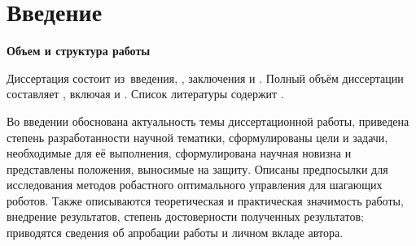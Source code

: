 \chapter*{Введение}                         %

\newcommand{\actuality}{\textbf{\actualityTXT}}
\newcommand{\progress}{\textbf{\progressTXT}}
\newcommand{\objectsubject}{\textbf{\objectsubjectTXT}}
\newcommand{\aimtasks}{\textbf{\aimtasksTXT}}
\newcommand{\methods}{\textbf{\methodsTXT}}
\newcommand{\defpositions}{\textbf{\defpositionsTXT}}
\newcommand{\compliances}{\textbf{\complianceTXT}}
\newcommand{\novelty}{\textbf{\noveltyTXT}}
\newcommand{\probation}{\textbf{\probationTXT}}
\newcommand{\influence}{\textbf{\influenceTXT}}
\newcommand{\reliability}{\textbf{\reliabilityTXT}}
\newcommand{\publications}{\textbf{\publicationsTXT}}
\newcommand{\contribution}{\textbf{\contributionTXT}}


\textbf{Объем и структура работы} 

Диссертация состоит из~введения,
,
заключения и
.
%
Полный объём диссертации составляет
, включая
 и
.
Список литературы содержит
.

Во введении обоснована актуальность темы диссертационной работы, приведена степень разработанности научной тематики, сформулированы цели и задачи, необходимые для её выполнения, сформулирована научная новизна и представлены положения, выносимые на защиту. Описаны предпосылки для исследования методов робастного оптимального управления для шагающих роботов. Также описываются теоретическая и практическая значимость работы, внедрение результатов, степень достоверности полученных результатов; приводятся сведения об апробации работы и личном вкладе автора. 

